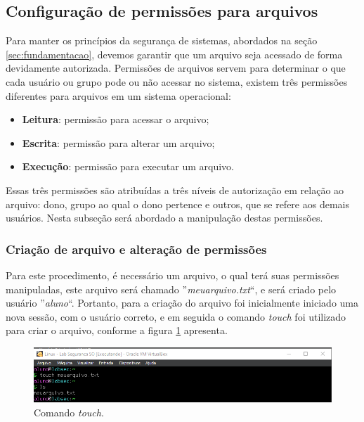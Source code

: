 \documentclass[
	12pt,				%
	oneside,   	        %
	a4paper,			%
	english,			%
	french,				%
	spanish,			%
	brazil,				%
	]{pacotes/abntex2}
\begin{document}
\subsection{Configuração de permissões para arquivos}
Para manter os princípios da segurança de sistemas, abordados na seção \ref{sec:fundamentacao}, devemos garantir que um arquivo seja acessado de forma devidamente autorizada. Permissões de arquivos servem para determinar o que cada usuário ou grupo pode ou não acessar no sistema, existem três permissões diferentes para arquivos em um sistema operacional:
\begin{itemize}
    \item \textbf{Leitura}: permissão para acessar o arquivo;
    \item \textbf{Escrita}: permissão para alterar um arquivo;
    \item \textbf{Execução}: permissão para executar um arquivo.
\end{itemize}

Essas três permissões são atribuídas a três níveis de autorização em relação ao arquivo: dono, grupo ao qual o dono pertence e outros, que se refere aos demais usuários. Nesta subseção será abordado a manipulação destas permissões.

\subsubsection{Criação de arquivo e alteração de permissões}
Para este procedimento, é necessário um arquivo, o qual terá suas permissões manipuladas, este arquivo será chamado ''\textit{meuarquivo.txt}``, e será criado pelo usuário ''\textit{aluno}``. Portanto, para a criação do arquivo foi inicialmente iniciado uma nova sessão, com o usuário correto, e em seguida o comando \textit{touch} foi utilizado para criar o arquivo, conforme a figura \ref{fig:touch} apresenta.
\begin{figure}[H]
  \centering
  \includegraphics[scale=0.7]{figuras/touch.png}
  \caption{Comando \textit{touch}.}
  \label{fig:touch}
\end{figure}
\end{document}
